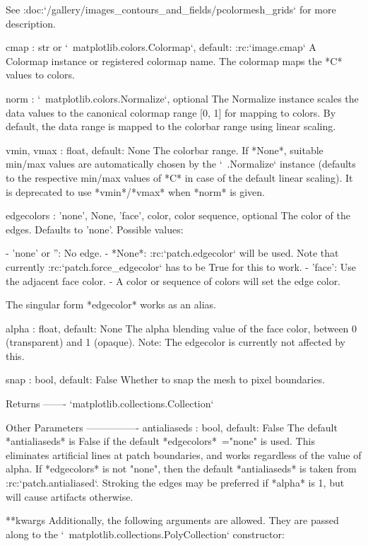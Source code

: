 \begin{DoxyVerb}
\begin{DoxyVerb}
    See :doc:`/gallery/images_contours_and_fields/pcolormesh_grids`
    for more description.

cmap : str or `~matplotlib.colors.Colormap`, default: :rc:`image.cmap`
    A Colormap instance or registered colormap name. The colormap
    maps the *C* values to colors.

norm : `~matplotlib.colors.Normalize`, optional
    The Normalize instance scales the data values to the canonical
    colormap range [0, 1] for mapping to colors. By default, the data
    range is mapped to the colorbar range using linear scaling.

vmin, vmax : float, default: None
    The colorbar range. If *None*, suitable min/max values are
    automatically chosen by the `~.Normalize` instance (defaults to
    the respective min/max values of *C* in case of the default linear
    scaling).
    It is deprecated to use *vmin*/*vmax* when *norm* is given.

edgecolors : {'none', None, 'face', color, color sequence}, optional
    The color of the edges. Defaults to 'none'. Possible values:

    - 'none' or '': No edge.
    - *None*: :rc:`patch.edgecolor` will be used. Note that currently
      :rc:`patch.force_edgecolor` has to be True for this to work.
    - 'face': Use the adjacent face color.
    - A color or sequence of colors will set the edge color.

    The singular form *edgecolor* works as an alias.

alpha : float, default: None
    The alpha blending value of the face color, between 0 (transparent)
    and 1 (opaque). Note: The edgecolor is currently not affected by
    this.

snap : bool, default: False
    Whether to snap the mesh to pixel boundaries.

Returns
-------
`matplotlib.collections.Collection`

Other Parameters
----------------
antialiaseds : bool, default: False
    The default *antialiaseds* is False if the default
    *edgecolors*\ ="none" is used.  This eliminates artificial lines
    at patch boundaries, and works regardless of the value of alpha.
    If *edgecolors* is not "none", then the default *antialiaseds*
    is taken from :rc:`patch.antialiased`.
    Stroking the edges may be preferred if *alpha* is 1, but will
    cause artifacts otherwise.

**kwargs
    Additionally, the following arguments are allowed. They are passed
    along to the `~matplotlib.collections.PolyCollection` constructor:


\end{DoxyVerb}
\end{DoxyVerb}
